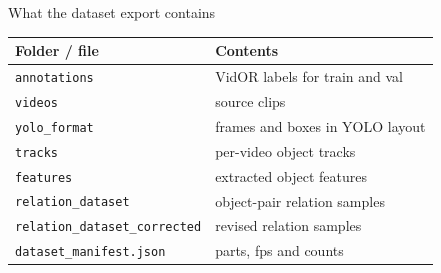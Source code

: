 \documentclass[aspectratio=169,11pt]{beamer}
\begin{document}
\begin{frame}{What the dataset export contains}
  \centering
  \vspace{0.2cm}
  \begin{tabular}{@{}p{5.6cm}p{7.6cm}@{}}
    \toprule
    \textbf{Folder / file} & \textbf{Contents}\\
    \midrule
    \texttt{annotations} & VidOR labels for train and val\\
    \texttt{videos} & source clips\\
    \texttt{yolo\_format} & frames and boxes in YOLO layout\\
    \texttt{tracks} & per-video object tracks\\
    \texttt{features} & extracted object features\\
    \texttt{relation\_dataset} & object-pair relation samples\\
    \texttt{relation\_dataset\_corrected} & revised relation samples\\
    \texttt{dataset\_manifest.json} & parts, fps and counts\\
    \bottomrule
  \end{tabular}
\end{frame}
\end{document}
